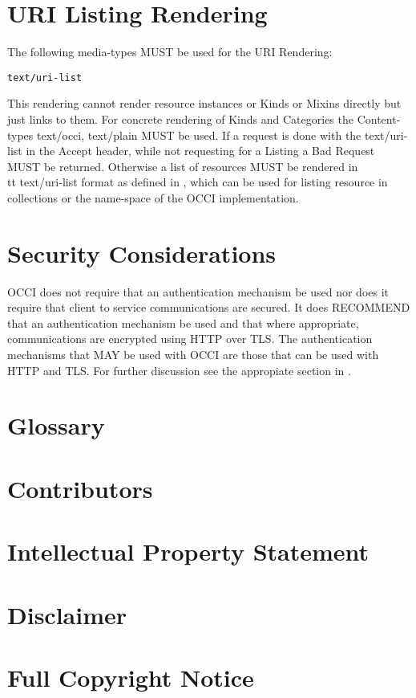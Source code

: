 \documentclass[10pt,a4paper]{article}
\begin{document}
\section{URI Listing Rendering}
\label{sec:urilist}
The following media-types MUST be used for the URI Rendering:

{\tt text/uri-list}

This rendering cannot render resource instances or Kinds or Mixins directly but just links to them. For concrete rendering of Kinds and Categories the Content-types text/occi, text/plain MUST be used. If a request is done with the text/uri-list in the Accept header, while not requesting for a Listing a Bad Request MUST be returned. Otherwise a list of resources MUST be rendered in {\\tt text/uri-list} format as defined in \cite{rfc2483}, which can be used for listing resource in collections or the name-space of the OCCI implementation.
\section{Security Considerations}
OCCI does not require that an authentication mechanism be used nor
does it require that client to service communications are secured. It
does RECOMMEND that an authentication mechanism be used and that where
appropriate, communications are encrypted using HTTP over TLS. The
authentication mechanisms that MAY be used with OCCI are those that
can be used with HTTP and TLS. For further discussion see the 
appropiate section in \cite{occi:protocol}.

\section{Glossary}
\label{sec:glossary}


\section{Contributors}


\section{Intellectual Property Statement}


\section{Disclaimer}


\section{Full Copyright Notice}




\end{document}
